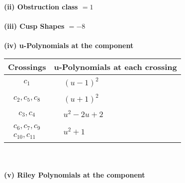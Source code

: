 \documentclass[1p]{elsarticle_modified}
\theoremstyle{definition}
\begin{document}
\flushleft \textbf{(ii) Obstruction class $= 1$}\\~\\
\flushleft \textbf{(iii) Cusp Shapes $= -8$}\\~\\
\newpage\renewcommand{\arraystretch}{1}
\flushleft \textbf{(iv) u-Polynomials at the component}\newline \\
\begin{tabular}{m{50pt}|m{274pt}}
Crossings & \hspace{64pt}u-Polynomials at each crossing \\
\hline $$\begin{aligned}c_{1}\end{aligned}$$&$\begin{aligned}
&(u-1)^2
\end{aligned}$\\
\hline $$\begin{aligned}c_{2},c_{5},c_{8}\end{aligned}$$&$\begin{aligned}
&(u+1)^2
\end{aligned}$\\
\hline $$\begin{aligned}c_{3},c_{4}\end{aligned}$$&$\begin{aligned}
&u^2-2 u+2
\end{aligned}$\\
\hline $$\begin{aligned}c_{6},c_{7},c_{9}\\c_{10},c_{11}\end{aligned}$$&$\begin{aligned}
&u^2+1
\end{aligned}$\\
\hline
\end{tabular}\\~\\
\newpage\renewcommand{\arraystretch}{1}
\flushleft \textbf{(v) Riley Polynomials at the component}\newline \\
\end{document}
